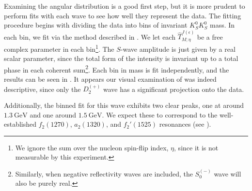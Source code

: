 Examining the angular distribution is a good first step, but it is more prudent to perform fits with each wave to see how well they represent the data. The fitting procedure begins with dividing the data into bins of invariant $K_S^0K_S^0$ mass. In each bin, we fit  via the method described in . We let each $\hat{T}_{M;\eta}^{J(\epsilon)}$ be a free complex parameter in each bin\footnote{We ignore the sum over the nucleon spin-flip index, $\eta$, since it is not measurable by this experiment.}. The $S$-wave amplitude is just given by a real scalar parameter, since the total form of the intensity is invariant up to a total phase in each coherent sum\footnote{Similarly, when negative reflectivity waves are included, the $S_0^{(-)}$ wave will also be purely real.}. Each bin in mass is fit independently, and the results can be seen in . It appears our visual examination of  was indeed descriptive, since only the $D_2^{(+)}$ wave has a significant projection onto the data.

Additionally, the binned fit for this wave exhibits two clear peaks, one at around $\SI{1.3}{\giga\electronvolt}$ and one around $\SI{1.5}{\giga\electronvolt}$. We expect these to correspond to the well-established $f_2(1270)$, $a_2(1320)$, and $f_2'(1525)$ resonances (see ). 


